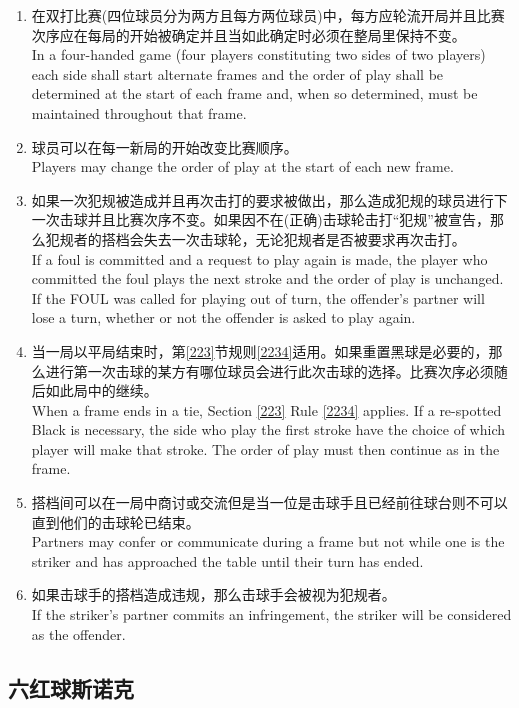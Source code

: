 \begin{enumerate}[label=(\alph*)]
    \item 在双打比赛(四位球员分为两方且每方两位球员)中，每方应轮流开局并且比赛次序应在每局的开始被确定并且当如此确定时必须在整局里保持不变。\\
    In a four-handed game (four players constituting two sides of two players) each side shall start alternate frames and the order of play shall be determined at the start of each frame and, when so determined, must be maintained throughout that frame.
    \item 球员可以在每一新局的开始改变比赛顺序。\\
    Players may change the order of play at the start of each new frame.
    \item 如果一次犯规被造成并且再次击打的要求被做出，那么造成犯规的球员进行下一次击球并且比赛次序不变。如果因不在(正确)击球轮击打``犯规''被宣告，那么犯规者的搭档会失去一次击球轮，无论犯规者是否被要求再次击打。\\
    If a foul is committed and a request to play again is made, the player who committed the foul plays the next stroke and the order of play is unchanged. If the FOUL was called for playing out of turn, the offender's partner will lose a turn, whether or not the offender is asked to play again.
    \item 当一局以平局结束时，第\ref{223}节规则\ref{2234}适用。如果重置黑球是必要的，那么进行第一次击球的某方有哪位球员会进行此次击球的选择。比赛次序必须随后如此局中的继续。\\
    When a frame ends in a tie, Section \ref{223} Rule \ref{2234} applies. If a re-spotted Black is necessary, the side who play the first stroke have the choice of which player will make that stroke. The order of play must then continue as in the frame.
    \item \label{22318e}搭档间可以在一局中商讨或交流但是当一位是击球手且已经前往球台则不可以直到他们的击球轮已结束。\\
    Partners may confer or communicate during a frame but not while one is the striker and has approached the table until their turn has ended. 
    \item 如果击球手的搭档造成违规，那么击球手会被视为犯规者。\\
    If the striker's partner commits an infringement, the striker will be considered as the offender.
\end{enumerate}

\subsection{六红球斯诺克}

